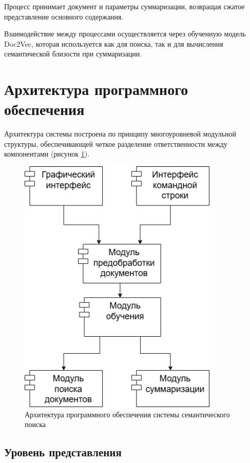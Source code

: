 Процесс принимает документ и параметры суммаризации, возвращая сжатое представление основного содержания.

Взаимодействие между процессами осуществляется через обученную модель Doc2Vec, которая используется как для поиска, так и для вычисления семантической близости при суммаризации.

\section{Архитектура программного обеспечения}

Архитектура системы построена по принципу многоуровневой модульной структуры, обеспечивающей четкое разделение ответственности между компонентами (рисунок \ref{architecture}).

\begin{figure}[H]
	\centering
	\includegraphics[width=0.85\textwidth]{images/PO.png}
	\caption{Архитектура программного обеспечения системы семантического поиска}
	\label{architecture}
\end{figure}

\subsection{Уровень представления}

